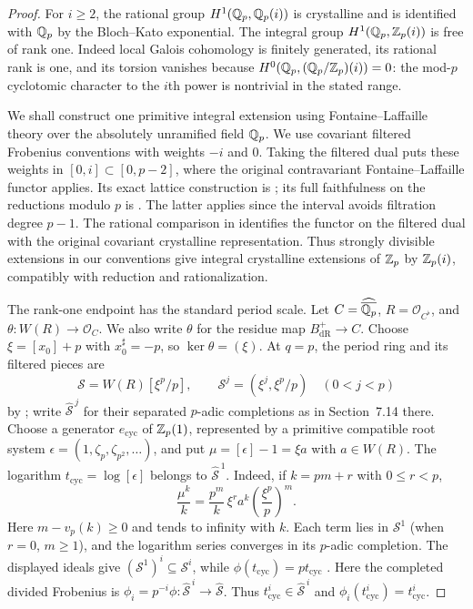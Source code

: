 \begin{proof}
For $i\geq2$, the rational group $H^1(\mathbb Q_p,\mathbb Q_p(i))$ is crystalline
and is identified with $\mathbb Q_p$ by the Bloch--Kato exponential.  The
integral group $H^1(\mathbb Q_p,\mathbb Z_p(i))$ is free of rank one.  Indeed local
Galois cohomology is finitely generated, its rational rank is one,
and its torsion vanishes because
$H^0(\mathbb Q_p,(\mathbb Q_p/\mathbb Z_p)(i))=0$: the mod-$p$ cyclotomic character to the
$i$th power is nontrivial in the stated range.

We shall construct one primitive integral extension using
Fontaine--Laffaille theory over the absolutely unramified field
$\mathbb Q_p$.  We use covariant filtered Frobenius conventions with weights
$-i$ and $0$.  Taking the filtered dual puts these weights in
$[0,i]\subset[0,p-2]$, where the original contravariant
Fontaine--Laffaille functor applies.  Its exact lattice construction
is \cite[Section~7.14 and Proposition~7.15(i)]{FontaineLaffaille};
its full faithfulness on the reductions modulo $p$ is
\cite[Theorem~6.1]{FontaineLaffaille}.  The latter applies since
the interval avoids filtration degree $p-1$.  The rational comparison
in \cite[Theorem~8.4(ii)]{FontaineLaffaille} identifies the functor on
the filtered dual with the original covariant crystalline
representation.  Thus strongly divisible extensions in our
conventions give integral crystalline extensions of $\mathbb Z_p$ by
$\mathbb Z_p(i)$, compatibly with reduction and rationalization.

The rank-one endpoint has the standard period scale.  Let
$C=\widehat{\overline{\mathbb Q_p}}$, $R=\mathcal O_{C^\flat}$, and
$\theta:W(R)\to\mathcal O_C$.  We also write $\theta$ for the
residue map $B_{\mathrm{dR}}^+\to C$.  Choose
$\xi=[x_0]+p$ with $x_0^\sharp=-p$, so $\ker\theta=(\xi)$.
At $q=p$, the period ring and its filtered pieces are
\[
 \mathscr S=W(R)[\xi^p/p],\qquad
 \mathscr S^j=(\xi^j,\xi^p/p)\quad(0<j<p)
\]
by \cite[Section~2.5 and Lemma~5.4]{FontaineLaffaille}; write
$\widehat{\mathscr S}^{\,j}$ for their separated $p$-adic completions
as in Section~7.14 there.  Choose a generator $e_{\mathrm{cyc}}$ of
$\mathbb Z_p(1)$, represented by a primitive compatible root system
$\epsilon=(1,\zeta_p,\zeta_{p^2},\ldots)$, and put $\mu=[\epsilon]-1=\xi a$ with $a\in W(R)$.
The logarithm $t_{\mathrm{cyc}}=\log[\epsilon]$ belongs to
$\widehat{\mathscr S}^{\,1}$.  Indeed, if $k=pm+r$ with $0\leq r<p$,
\[
 \frac{\mu^k}{k}
 =\frac{p^m}{k}\,\xi^r a^k\left(\frac{\xi^p}{p}\right)^m.
\]
Here $m-v_p(k)\geq0$ and tends to infinity with $k$.  Each term lies
in $\mathscr S^1$ (when $r=0$, $m\geq1$), and the logarithm series
converges in its $p$-adic completion.  The displayed ideals give
$(\mathscr S^1)^i\subseteq\mathscr S^i$, while
$\phi(t_{\mathrm{cyc}})=p t_{\mathrm{cyc}}$
\cite[Section~4.11]{FontaineBarsottiTate}.
Here the completed divided Frobenius is
$\phi_i=p^{-i}\phi:\widehat{\mathscr S}^{\,i}\to\widehat{\mathscr S}$.
Thus
$t_{\mathrm{cyc}}^i\in\widehat{\mathscr S}^{\,i}$ and
$\phi_i(t_{\mathrm{cyc}}^i)=t_{\mathrm{cyc}}^i$.


\end{proof}
